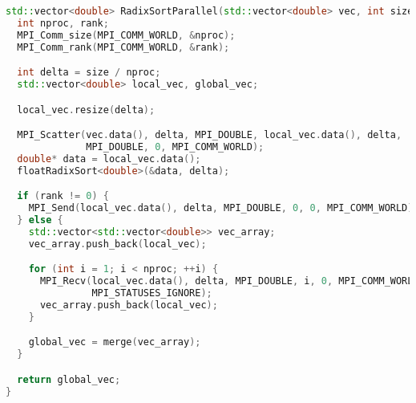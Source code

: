 \documentclass{report}
\begin{document}
\begin{lstlisting}[language=C++]
std::vector<double> RadixSortParallel(std::vector<double> vec, int size) {
  int nproc, rank;
  MPI_Comm_size(MPI_COMM_WORLD, &nproc);
  MPI_Comm_rank(MPI_COMM_WORLD, &rank);

  int delta = size / nproc;
  std::vector<double> local_vec, global_vec;

  local_vec.resize(delta);

  MPI_Scatter(vec.data(), delta, MPI_DOUBLE, local_vec.data(), delta,
              MPI_DOUBLE, 0, MPI_COMM_WORLD);
  double* data = local_vec.data();
  floatRadixSort<double>(&data, delta);

  if (rank != 0) {
    MPI_Send(local_vec.data(), delta, MPI_DOUBLE, 0, 0, MPI_COMM_WORLD);
  } else {
    std::vector<std::vector<double>> vec_array;
    vec_array.push_back(local_vec);

    for (int i = 1; i < nproc; ++i) {
      MPI_Recv(local_vec.data(), delta, MPI_DOUBLE, i, 0, MPI_COMM_WORLD,
               MPI_STATUSES_IGNORE);
      vec_array.push_back(local_vec);
    }

    global_vec = merge(vec_array);
  }

  return global_vec;
}

\end{lstlisting}
\end{document}
